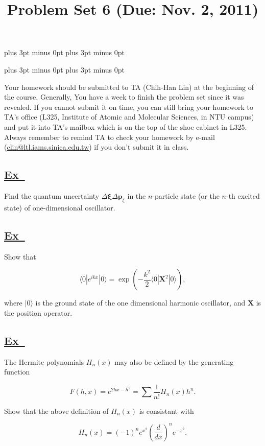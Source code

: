 \documentclass[a4paper,12pt]{article}
\newcommand{\excercise}{\addtocounter{section}{+1}
\subsection*{\underline{Ex~\thesection}}}
\newcommand{\sdelta}{\Delta}
\newcommand{\bra}[1]{\langle#1|}
\newcommand{\ket}[1]{|#1\rangle }
\begin{document}
\abovedisplayskip=-6pt plus 3pt minus 0pt
\belowdisplayskip=8pt plus 3pt minus 0pt

\abovedisplayshortskip=-6pt plus 3pt minus 0pt
\belowdisplayshortskip=8pt plus 3pt minus 0pt

\title{Problem Set 6 (Due: Nov. 2, 2011)}
\maketitle

Your homework should be submitted to TA (Chih-Han Lin) at the  beginning of the course. Generally, You have a week to finish the problem set since it was revealed. If you cannot submit it on time, you can still bring your homework to TA's office (L325, Institute of Atomic and Molecular Sciences, in NTU campus) and put it into TA's mailbox which is on the top of the shoe cabinet in L325. Always remember to remind TA to check your homework by e-mail (\url{clin@ltl.iams.sinica.edu.tw}) if you don't submit it in class.

%

\excercise

Find the quantum uncertainty $ \sdelta\bm{\xi}\sdelta\bm{p}_\xi $ in the $ n $-particle state (or the $n$-th excited state) of one-dimensional oscillator.



\excercise

Show that 

$$ \bra{0}e^{ikx}\ket{0}=\exp(-\frac{k^2}{2}\bra{0}\mathbf{X}^2\ket{0}), $$

\noindent where $ \ket{0} $ is the ground state of the one dimensional harmonic oscillator, and $ \mathbf{X} $ is the position operator.


\excercise
The Hermite polynomials $H_n(x)$ may also be defined by the generating function

$$
F(h,x)=e^{2hx-h^2}=\sum\frac{1}{n!}H_n(x)h^n.
$$ 

Show that the above definition of $H_n(x)$ is consistant with 

$$
H_n(x)=(-1)^ne^{x^2}\left(\frac{d}{dx}\right)^ne^{-x^2}.
$$
\end{document}

